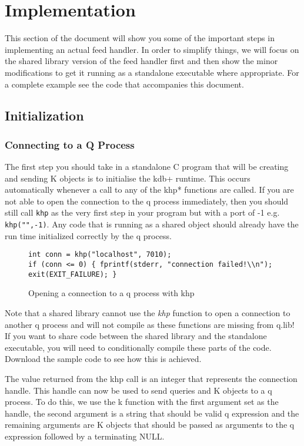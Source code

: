 \chapter{Implementation}

This section of the document will show you some of the important steps in implementing an actual
feed handler. In order to simplify things, we will focus on the shared library version of the feed
handler first and then show the minor modifications to get it running as a standalone executable
where appropriate. For a complete example see the code that accompanies this document.

\section{Initialization}

\subsection{Connecting to a Q Process}

The first step you should take in a standalone C program that will be creating and sending K objects
is to initialise the kdb+ runtime. This occurs automatically whenever a call to any of the khp* functions
are called. If you are not able to open the connection to the q process immediately, then you should still
call \verb|khp| as the very first step in your program but with a port of -1 e.g. \verb|khp("",-1)|. Any code
that is running as a shared object should already have the run time initialized correctly by the q process.

\begin{figure}
\begin{lstlisting}
int conn = khp("localhost", 7010);
if (conn <= 0) { fprintf(stderr, "connection failed!\\n"); exit(EXIT_FAILURE); }
\end{lstlisting}
\caption{Opening a connection to a q process with khp}
\end{figure}

Note that a shared library cannot use the \textit{khp} function to open a connection to another q process
and will not compile as these functions are missing from q.lib! If you want to share code between the
shared library and the standalone executable, you will need to conditionally compile these parts of
the code. Download the sample code to see how this is achieved.

The value returned from the khp call is an integer that represents the connection handle. This handle
can now be used to send queries and K objects to a q process. To do this, we use the k function with
the first argument set as the handle, the second argument is a string that should be valid q expression
and the remaining arguments are K objects that should be passed as arguments to the q expression followed
by a terminating NULL.

